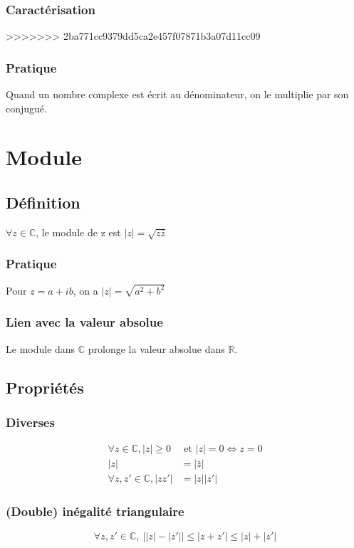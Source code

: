 \documentclass[12pt,a4paper,french]{book}
\begin{document}
			\subsubsection{Caractérisation}
>>>>>>> 2ba771cc9379dd5ca2e457f07871b3a07d11cc09
			\subsubsection{Pratique}
				Quand un nombre complexe est écrit au dénominateur, on le multiplie par son conjugué.
	\section{Module}
		\subsection{Définition}
			$\forall z \in \mathbb{C}$, le module de z est $\left| z\right| = \sqrt{z \bar{z}}$
			\subsubsection{Pratique}
			Pour $z=a+ib$, on a $\left| z\right| = \sqrt{a^2 + b^2}$
			\subsubsection{Lien avec la valeur absolue}
			Le module dans $\mathbb{C}$ prolonge la valeur absolue dans $\mathbb{R}$.
		\subsection{Propriétés}
			\subsubsection{Diverses}
			\[\begin{split}
				\forall z \in \mathbb{C},\left| z\right| \geqslant 0 &\mbox{ et } \left| z\right| = 0 \Leftrightarrow z= 0 \\
				\left| z \right| &= \left| \bar{z} \right| \\
				\forall z,z' \in \mathbb{C},\left| zz' \right|& = \left| z \right| \left| z' \right| 
			\end{split} \]
			\subsubsection{(Double) inégalité triangulaire}
			\[\forall z,z' \in \mathbb{C},\ \left|\left|z\right|-\left|z'\right|\right|\leqslant\left|z+z'\right| \leqslant \left|z\right| + \left|z'\right|\]
\end{document}
